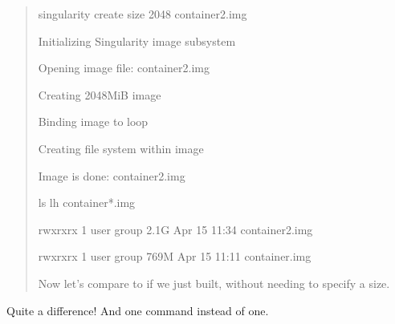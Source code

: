 \documentclass[letterpaper,10pt,english]{sphinxmanual}
\begin{document}
\begin{quote}
%
\begin{sphinxVerbatim}[commandchars=\\\{\}]
\PYGZdl{} singularity create \PYGZhy{}\PYGZhy{}size 2048 container2.img

Initializing Singularity image subsystem

Opening image file: container2.img

Creating 2048MiB image

Binding image to loop

Creating file system within image

Image is done: container2.img


\PYGZdl{} ls \PYGZhy{}lh container*.img

\PYGZhy{}rwxr\PYGZhy{}xr\PYGZhy{}x 1 user group 2.1G Apr 15 11:34 container2.img

\PYGZhy{}rwxr\PYGZhy{}xr\PYGZhy{}x 1 user group 769M Apr 15 11:11 container.img
\end{sphinxVerbatim}

Now let’s compare to if we just built, without needing to specify a
size.

%
\begin{sphinxVerbatim}[commandchars=\\\{\}]
    




  

 
\end{sphinxVerbatim}
\end{quote}

Quite a difference! And one command instead of one.
\end{document}
